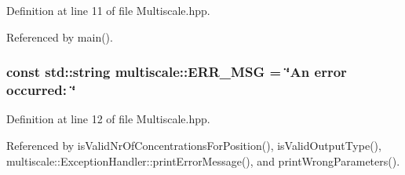 \-Definition at line 11 of file \-Multiscale.\-hpp.



\-Referenced by main().

\hypertarget{namespacemultiscale_a06490e4e11ef359aa0260f96579ce584}{
\subsubsection[{\-E\-R\-R\-\_\-\-M\-S\-G}]{\setlength{\rightskip}{0pt plus 5cm}const std\-::string {\bf multiscale\-::\-E\-R\-R\-\_\-\-M\-S\-G} = \char`\"{}\-An error occurred\-: \char`\"{}}}\label{namespacemultiscale_a06490e4e11ef359aa0260f96579ce584}


\-Definition at line 12 of file \-Multiscale.\-hpp.



\-Referenced by is\-Valid\-Nr\-Of\-Concentrations\-For\-Position(), is\-Valid\-Output\-Type(), multiscale\-::\-Exception\-Handler\-::print\-Error\-Message(), and print\-Wrong\-Parameters().

